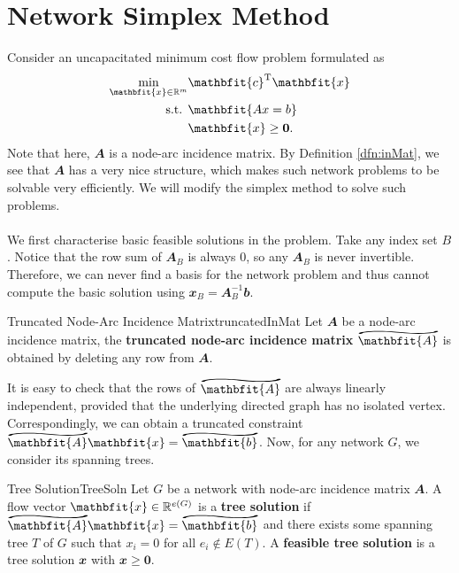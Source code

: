 \documentclass[math, code]{amznotes}
\renewcommand\widetilde[1]{\ThisStyle{%
  \setbox0=\hbox{$\SavedStyle#1$}%
  \stackengine{1pt-\LMpt}{$\SavedStyle#1$}{%
    \stretchto{\scaleto{\SavedStyle\mkern.2mu\sim}{.5467\wd0}}{.5\ht0}%
  }{O}{c}{F}{T}{S}%
}}
\theoremstyle{remark}
\begin{document}
\section{Network Simplex Method}
Consider an uncapacitated minimum cost flow problem formulated as
\begin{align*}
    \min_{\mathbfit{x} \in \R^m} & \mathbfit{c}^{\mathrm{T}}\mathbfit{x} \\
    \textrm{s.t. } & \mathbfit{Ax = b} \\
    & \mathbfit{x} \geq \mathbf{0}.
\end{align*}
Note that here, $\mathbfit{A}$ is a node-arc incidence matrix. By Definition \ref{dfn:inMat}, we see that $\mathbfit{A}$ has a very nice structure, which makes such network problems to be solvable very efficiently. We will modify the simplex method to solve such problems.
\\\\
We first characterise basic feasible solutions in the problem. Take any index set $B$. Notice that the row sum of $\mathbfit{A}_B$ is always $\mathbfit{0}$, so any $\mathbfit{A}_B$ is never invertible. Therefore, we can never find a basis for the network problem and thus cannot compute the basic solution using $\mathbfit{x}_B = \mathbfit{A}_B^{-1}\mathbfit{b}$.
\begin{dfnbox}{Truncated Node-Arc Incidence Matrix}{truncatedInMat}
    Let $\mathbfit{A}$ be a node-arc incidence matrix, the {\color{red} \textbf{truncated node-arc incidence matrix}} $\widetilde{\mathbfit{A}}$ is obtained by deleting any row from $\mathbfit{A}$.
\end{dfnbox}
It is easy to check that the rows of $\widetilde{\mathbfit{A}}$ are always linearly independent, provided that the underlying directed graph has no isolated vertex. Correspondingly, we can obtain a truncated constraint $\widetilde{\mathbfit{A}}\mathbfit{x} = \widetilde{\mathbfit{b}}$. Now, for any network $G$, we consider its spanning trees.
\begin{dfnbox}{Tree Solution}{TreeSoln}
    Let $G$ be a network with node-arc incidence matrix $\mathbfit{A}$. A flow vector $\mathbfit{x} \in \R^{e(G)}$ is a {\color{red} \textbf{tree solution}} if $\widetilde{\mathbfit{A}}\mathbfit{x} = \widetilde{\mathbfit{b}}$ and there exists some spanning tree $T$ of $G$ such that $x_i = 0$ for all $e_i \notin E(T)$. A {\color{red} \textbf{feasible tree solution}} is a tree solution $\mathbfit{x}$ with $\mathbfit{x} \geq \mathbf{0}$.
\end{dfnbox}
\end{document}
